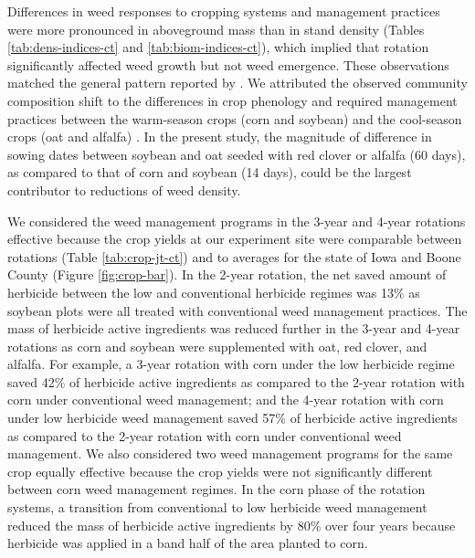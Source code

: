 \documentclass[
]{article}
\begin{document}
Differences in weed responses to cropping systems and management practices were more pronounced in aboveground mass than in stand density (Tables \ref{tab:dens-indices-ct} and \ref{tab:biom-indices-ct}), which implied that rotation significantly affected weed growth but not weed emergence. These observations matched the general pattern reported by \citet{weisbergerDoesDiversifyingCrop2019}. We attributed the observed community composition shift to the differences in crop phenology and required management practices between the warm-season crops (corn and soybean) and the cool-season crops (oat and alfalfa) \citep{gabaAgroecologicalWeedControl2014, weisbergerDoesDiversifyingCrop2019}. In the present study, the magnitude of difference in sowing dates between soybean and oat seeded with red clover or alfalfa (60 days), as compared to that of corn and soybean (14 days), could be the largest contributor to reductions of weed density.

We considered the weed management programs in the 3-year and 4-year rotations effective because the crop yields at our experiment site were comparable between rotations (Table \ref{tab:crop-jt-ct}) and to averages for the state of Iowa and Boone County (Figure \ref{fig:crop-bar}). In the 2-year rotation, the net saved amount of herbicide between the low and conventional herbicide regimes was 13\% as soybean plots were all treated with conventional weed management practices. The mass of herbicide active ingredients was reduced further in the 3-year and 4-year rotations as corn and soybean were supplemented with oat, red clover, and alfalfa. For example, a 3-year rotation with corn under the low herbicide regime saved 42\% of herbicide active ingredients as compared to the 2-year rotation with corn under conventional weed management; and the 4-year rotation with corn under low herbicide weed management saved 57\% of herbicide active ingredients as compared to the 2-year rotation with corn under conventional weed management. We also considered two weed management programs for the same crop equally effective because the crop yields were not significantly different between corn weed management regimes. In the corn phase of the rotation systems, a transition from conventional to low herbicide weed management reduced the mass of herbicide active ingredients by 80\% over four years because herbicide was applied in a band half of the area planted to corn.
\end{document}

